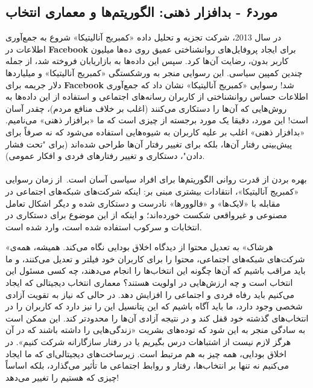 \newpage

{
\subsection*{مورد۶ - بدافزار ذهنی: الگوریتم‌ها و معماری انتخاب}
\label{subsec:مورد۶ - بدافزار ذهنی: الگوریتم‌ها و معماری انتخاب}
در سال 2013، شرکت تجزیه و تحلیل داده «کمبریج آنالیتیکا» شروع به جمع‌آوری اطلاعات در \textenglish{\textbf{Facebook}} برای ایجاد پروفایل‌های روانشناختی عمیق روی ده‌ها میلیون کاربر بدون، رضایت آن‌ها کرد.
سپس این داده‌ها به بازاریابان فروخته شد، از جمله چندین کمپین سیاسی.
این رسوایی منجر به ورشکستگی «کمبریج آنالیتیکا» و میلیاردها دلار جریمه برای \textenglish{\textbf{Facebook}} شد!
رسوایی «کمبریج آنالیتیکا» نشان داد که جمع‌آوری اطلاعات حساس روانشناختی از کاربران رسانه‌های اجتماعی و استفاده از این داده‌ها به روش‌هایی که آن‌ها را دستکاری می‌کنند (اغلب بر خلاف منافع مردم)، چقدر آسان است!
این مورد، دقیقا یک مورد برجسته از چیزی است که ما «برافزار ذهنی» می‌نامیم.
«بدافزار ذهنی» اغلب بر علیه کاربران به شیوه‌هایی استفاده می‌شود که نه صرفاً برای پیش‌بینی رفتار آن‌ها، بلکه برای تغییر رفتار آن‌ها طراحی شده‌اند (برای "تحت فشار دادن"، دستکاری و تغییر رفتارهای فردی و افکار عمومی).
}
\paragraph{}
بهره بردن از قدرت روانی الگوریتم‌ها برای افراد سیاسی آسان است.\     از زمان رسوایی «کمبریج آنالیتیکا»، انتقادات بیشتری مبنی بر: اینکه شرکت‌های شبکه‌های اجتماعی در مقابله با «لایک‌ها» و «فالوورها» نادرست و دستکاری شده و دیگر اشکال تعامل مصنوعی و غیرواقعی شکست خورده‌اند؛ و اینکه از این موضوع برای دستکاری در انتخابات و سرکوب استفاده شده است، وارد شده است.

«هرشاک» به تعدیل محتوا از دیدگاه اخلاق بودایی نگاه می‌کند.
همیشه، همه‌ی شرکت‌های شبکه‌های اجتماعی، محتوا را برای کاربران خود فیلتر و تعدیل می‌کنند، و ما باید مراقب باشیم که آن‌ها چگونه این انتخاب‌ها را انجام می‌دهند، چه کسی مسئول این انتخاب است و چه ارزش‌هایی در اولویت هستند؟ معماری انتخاب دیجیتالی که ایجاد می‌کنیم باید رفاه فردی و اجتماعی را افزایش دهد.
در حالی که نیاز به تقویت آزادی شخصی وجود دارد، ما باید آگاه باشیم که این پتانسیل این را نیز دارد که کاربران را در انتخاب‌های گذشته خود قفل کند و در نتیجه آزادی آن‌ها را محدودتر کند.
این ممکن است به سادگی منجر به این شود که توده‌های بشریت «زندگی‌هایی را داشته باشند که در آن هرگز لازم نیست از اشتباهات درس بگیریم یا در رفتار سازگارانه شرکت کنیم».
در اخلاق بودایی، همه چیز به هم مرتبط است.
زیرساخت‌های دیجیتالی‌ای که ما ایجاد می‌کنیم نه تنها بر انتخاب‌ها، رفتار و روابط اجتماعی ما تأثیر می‌گذارد، بلکه اساساً چیزی که هستیم را تغییر می‌دهد!

